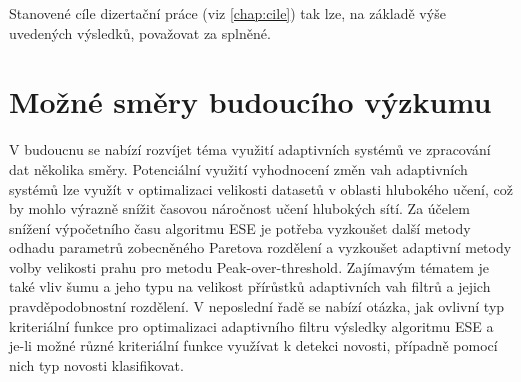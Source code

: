 \par
Stanovené cíle dizertační práce (viz \ref{chap:cile}) tak lze, na základě výše uvedených výsledků, považovat za splněné.

\section{Možné směry budoucího výzkumu}
V budoucnu se nabízí rozvíjet téma využití adaptivních systémů ve zpracování dat několika směry. Potenciální využití vyhodnocení změn vah adaptivních systémů lze využít v optimalizaci velikosti datasetů v oblasti hlubokého učení, což by mohlo výrazně snížit časovou náročnost učení hlubokých sítí. Za účelem snížení výpočetního času algoritmu ESE je potřeba vyzkoušet další metody odhadu parametrů zobecněného Paretova rozdělení a vyzkoušet adaptivní metody volby velikosti prahu pro metodu Peak-over-threshold. Zajímavým tématem je také vliv šumu a jeho typu na velikost přírůstků adaptivních vah filtrů a jejich pravděpodobnostní rozdělení. V neposlední řadě se nabízí otázka, jak ovlivní typ kriteriální funkce pro optimalizaci adaptivního filtru výsledky algoritmu ESE a je-li možné různé kriteriální funkce využívat k detekci novosti, případně pomocí nich typ novosti klasifikovat. 